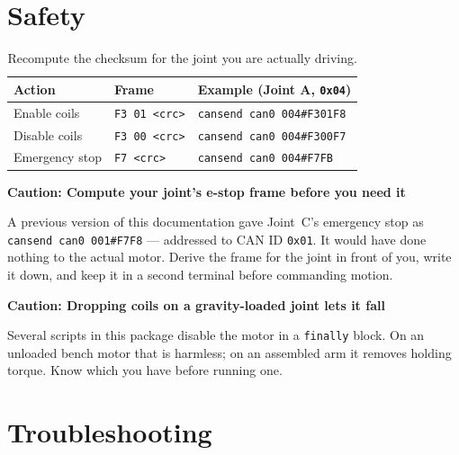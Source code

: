 \documentclass[11pt,letterpaper]{article}
\newenvironment{caution}[1]{%
    \par\addvspace{8pt}%
    \noindent{\color{cautionred}\rule{\linewidth}{0.8pt}}\par\vspace{2pt}
    \noindent\textbf{\color{cautionred}Caution: #1}\par\vspace{2pt}
}{%
    \par\vspace{2pt}\noindent{\color{cautionred}\rule{\linewidth}{0.4pt}}%
    \par\addvspace{8pt}%
}
\begin{document}
\section{Safety}
\label{sec:safety}

\begin{table}[h]
\centering
\begin{tabular}{lll}
\toprule
\textbf{Action} & \textbf{Frame} & \textbf{Example (Joint A, \texttt{0x04})} \\ \midrule
Enable coils    & \texttt{F3 01 <crc>} & \texttt{cansend can0 004\#F301F8} \\
Disable coils   & \texttt{F3 00 <crc>} & \texttt{cansend can0 004\#F300F7} \\
Emergency stop  & \texttt{F7 <crc>}    & \texttt{cansend can0 004\#F7FB} \\
\bottomrule
\end{tabular}
\caption{Recompute the checksum for the joint you are actually driving.}
\end{table}

\begin{caution}{Compute your joint's e-stop frame before you need it}
A previous version of this documentation gave Joint~C's emergency stop as
\texttt{cansend can0 001\#F7F8} --- addressed to CAN ID \texttt{0x01}. It would have
done nothing to the actual motor. Derive the frame for the joint in front of you,
write it down, and keep it in a second terminal before commanding motion.
\end{caution}

\begin{caution}{Dropping coils on a gravity-loaded joint lets it fall}
Several scripts in this package disable the motor in a \texttt{finally} block. On an
unloaded bench motor that is harmless; on an assembled arm it removes holding
torque. Know which you have before running one.
\end{caution}

\section{Troubleshooting}
\label{sec:troubleshooting}
\end{document}
